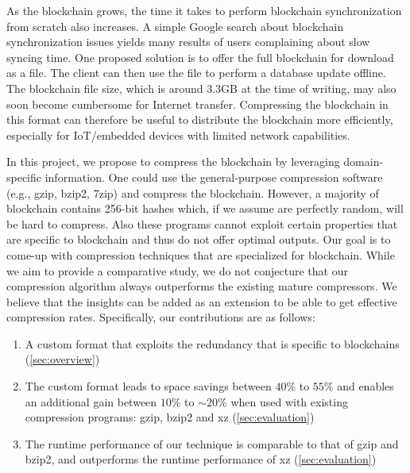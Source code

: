 As the blockchain grows, the time it takes to perform blockchain synchronization from scratch also increases.
A simple Google search about \eth{} blockchain synchronization issues yields many results of users complaining about slow syncing time.
One proposed solution is to offer the full blockchain for download as a file.
The client can then use the file to perform a database update offline.
The blockchain file size, which is around 3.3GB at the time of writing, may also soon become cumbersome for Internet transfer.
Compressing the blockchain in this format can therefore be useful to distribute the blockchain more efficiently,
especially for IoT/embedded devices with limited network capabilities.

In this project, we propose to compress the \eth{} blockchain by leveraging domain-specific information.
One could use the general-purpose compression software (e.g., gzip, bzip2, 7zip) and compress the blockchain.
However, a majority of blockchain contains 256-bit hashes which, if we assume are perfectly random, will be hard to compress.
Also these programs cannot exploit certain properties that are specific to blockchain and thus do not offer optimal outputs.
Our goal is to come-up with compression techniques that  are specialized for blockchain.
While we aim to provide a comparative study, we do not conjecture that our compression algorithm always outperforms the
existing mature compressors.
We believe that the insights can be added as an extension to be able to get effective compression rates.
Specifically, our contributions are as follows:
\begin{enumerate}
	\item A custom format that exploits the redundancy that is specific to blockchains (\autoref{sec:overview}) 
	\item The custom format leads to space savings between $40\%$ to $55\%$ and enables an additional gain between $10\%$ to $\sim 20\%$ when used with existing compression programs: gzip, bzip2 and xz (\autoref{sec:evaluation})
	\item The runtime performance of our technique is comparable to that of gzip and bzip2, and outperforms the runtime performance of xz (\autoref{sec:evaluation})
\end{enumerate}
